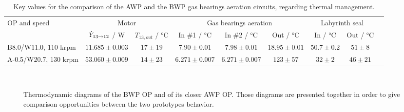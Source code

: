 \begin{table}[htbp]
  \footnotesize
  \centering
\begin{tabular}{lcccccccc}
  \toprule
  \multirow{2}{*}{OP and speed} &
  \multicolumn{2}{c}{Motor} &
  \multicolumn{3}{c}{Gas bearings aeration} &
  \multicolumn{2}{c}{Labyrinth seal}\\
  & $\dot{Y}_{13 \rightarrow 12}$ / \si{\watt} &
  $T_{13,out}$ / \si{\degreeCelsius} & In \#1 / \si{\degreeCelsius} &
  In \#2 / \si{\degreeCelsius} & Out / \si{\degreeCelsius} &
  In / \si{\degreeCelsius} & Out / \si{\degreeCelsius}\\
  \midrule
  B8.0/W11.0, 110 krpm & $\num{11.685} \pm \num{0.003}$ & $\num{17} \pm \num{19}$ & $\pmb{\num{7.90} \pm \num{0.01}}$ & $\pmb{\num{7.98} \pm \num{0.01}}$ & $\pmb{\num{18.95} \pm \num{0.01}}$ & $\num{50.7} \pm \num{0.2}$ & $\num{51} \pm \num{8}$ \\
  A-0.5/W20.7, 130 krpm & $\num{53.060} \pm \num{0.009}$ & $\num{14} \pm \num{23}$ & $\pmb{\num{6.271} \pm \num{0.007}}$ & $\pmb{\num{6.271} \pm \num{0.007}}$ & $\num{123} \pm \num{57}$ & $\num{32} \pm \num{2}$ & $\num{46} \pm \num{21}$ \\
  \bottomrule
\end{tabular}
\caption[Key values for the comparison of the AWP and the BWP gas bearings aeration circuits]{Key values for the comparison of the AWP and the BWP gas bearings aeration circuits, regarding thermal management.}
\label{tab:key-values-comp-awp-bwp}
\end{table}

\begin{figure}[htbp]
  \centering
  \hspace{1em}
  \\
  \hspace{1em}
  \caption[Thermodynamic diagrams of the BWP OP and of its closer AWP
  OP]{Thermodynamic diagrams of the BWP OP and of its closer AWP
    OP. Those diagrams are presented together in order to give
    comparison opportunities between the two prototypes behavior.}
  \label{fig:bwp-B8.0/W11.0-A-0.5/W20.7-diagrams}
\end{figure}

